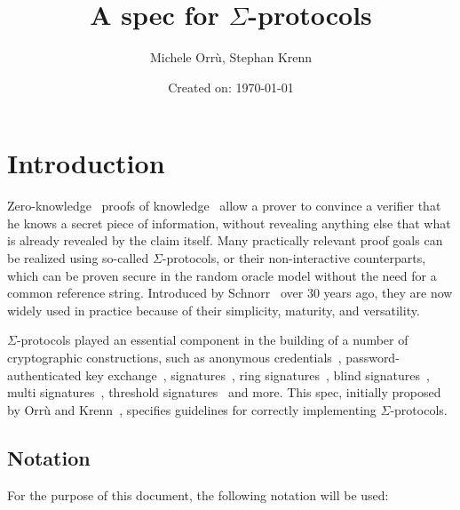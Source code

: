 \documentclass[11pt]{article}
\title{A spec for $\Sigma$-protocols}
\date{Created on: \today}
\author{Michele Orrù, Stephan Krenn}
\begin{document}
%
\maketitle              %
%
{\hypersetup{hidelinks} \tableofcontents}

\section{Introduction}

Zero-knowledge~\cite{GolMicRac89} proofs of knowledge~\cite{C:BelGol92} allow a prover to convince a verifier that he knows a secret piece of information, without revealing anything else that what is already revealed by the claim itself.
Many practically relevant proof goals can be realized using so-called $\Sigma$-protocols, or their non-interactive counterparts, which can be proven secure in the random oracle model without the need for a common reference string.
Introduced by Schnorr~\cite{JC:Schnorr91} over 30 years ago, they are now widely used  in practice because of their simplicity, maturity, and versatility.

$\Sigma$-protocols played an essential component in the building of a number of cryptographic
constructions,
such as anonymous credentials~\cite{CCS:ChaMeiZav14}, password-authenticated key exchange~\cite{jpake}, signatures~\cite{C:Schnorr89},
ring signatures~\cite{borromeansig}, blind signatures~\cite{CCS:PoiSte97}, multi signatures~\cite{CCS:NRSW20}, threshold signatures~\cite{EPRINT:KomGol20} and more. This spec, initially proposed by Orrù and Krenn~\cite{sigma-proposal}, specifies guidelines for correctly implementing $\Sigma$-protocols.

\subsection{Notation}
\label{sec:notation}

For the purpose of this document, the following notation will be used:
\end{document}
